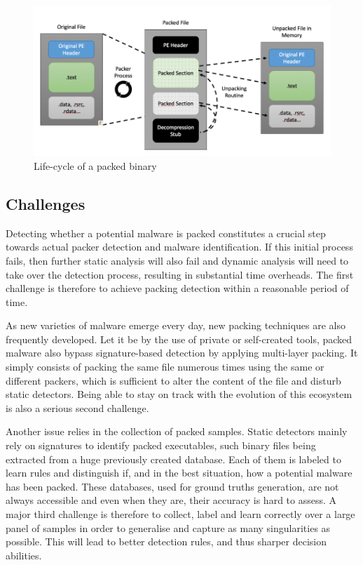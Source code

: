 \begin{figure}[!ht]
\centering
  \includegraphics[width=\linewidth]{Figures/packing_process.png}
  \caption{Life-cycle of a packed binary \cite{mc_afee}}
  \label{fig:packing_process}
\end{figure}

\subsection*{Challenges}

Detecting whether a potential malware is packed constitutes a crucial step towards actual packer detection and malware identification. If this initial process fails, then further static analysis will also fail and dynamic analysis will need to take over the detection process, resulting in substantial time overheads. The first challenge is therefore to achieve packing detection within a reasonable period of time.

As new varieties of malware emerge every day, new packing techniques are also frequently developed. Let it be by the use of private or self-created tools, packed malware also bypass signature-based detection by applying multi-layer packing. It simply consists of packing the same file numerous times using the same or different packers, which is sufficient to alter the content of the file and disturb static detectors. Being able to stay on track with the evolution of this ecosystem is also a serious second challenge.

Another issue relies in the collection of packed samples. Static detectors mainly rely on signatures to identify packed executables, such binary files being extracted from a huge previously created database. Each of them is labeled to learn rules and distinguish if, and in the best situation, how a potential malware has been packed. These databases, used for ground truths generation, are not always accessible and even when they are, their accuracy is hard to assess. A major third challenge is therefore to collect, label and learn correctly over a large panel of samples in order to generalise and capture as many singularities as possible. This will lead to better detection rules, and thus sharper decision abilities.

